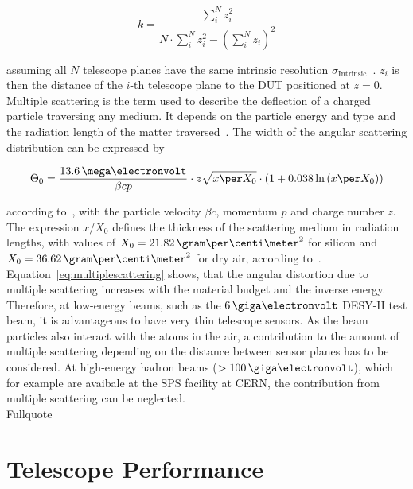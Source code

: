 \begin{equation}
k = \frac{\sum_i^N z_i^2}{N \cdot \sum_i^N z_i^2 - \left( \sum_i^N z_i
\right)^2}
\end{equation}

assuming all $N$ telescope planes have the same intrinsic resolution
$\sigma_{\textrm{Intrinsic}}$~\cite{ref:eudetreport200902}. $z_i$ is then the
distance of the $i$-th telescope plane to the DUT positioned at $z=0$.\\

Multiple scattering is the term used to describe the deflection of a charged
particle traversing any medium. It depends on the particle energy and type
and the radiation length of the matter traversed~\cite{ref:scatteringhighland}.
The width of the angular scattering distribution can be expressed by

\begin{equation}
\label{eq:multiplescattering}
\Theta_{0} = \frac{13.6\,\mega\electronvolt}{\beta c p} \cdot z
\sqrt{x \per X_0}
\cdot \left( 1 + 0.038 \ln{\left( x \per X_0\right) } \right)
\end{equation}

according to~\cite{ref:PDG-2014}, with the particle velocity $\beta c$, momentum
$p$ and charge number $z$. The expression $x/X_0$ defines the thickness of the
scattering medium in radiation lengths, with values of $X_0 =
21.82\,\allowbreak\gram\per\centi\meter^2$ for silicon and $X_0 =
36.62\,\gram\per\centi\meter^2$ for dry air, according to~\cite{ref:x0values}.\\

Equation~\ref{eq:multiplescattering} shows, that the angular distortion due to
multiple scattering increases with the material budget and the inverse energy.
Therefore, at low-energy beams, such as the $6\,\giga\electronvolt$ DESY-II test
beam, it is advantageous to have very thin telescope sensors. As the beam
particles also interact with the atoms in the air, a contribution to the amount
of multiple scattering depending on the distance between sensor planes has to be
considered. At high-energy hadron beams ($> 100\,\giga\electronvolt$), which for
example are avaibale at the SPS facility at CERN, the contribution from multiple
scattering can be neglected.\\





Fullquote~\cite{ref:thomas}
\bigskip


\section{Telescope Performance}\label{sec:telescoperesolution}


